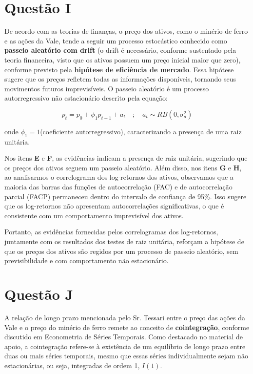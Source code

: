 \documentclass[a4paper,12pt]{article}[abntex2]
\begin{document}
\section*{\textbf{Questão I}}

De acordo com as teorias de finanças, o preço dos ativos, como o minério de ferro e as ações da Vale, tende a seguir um processo estocástico conhecido como \textbf{passeio aleatório com drift} (o drift é necessário, conforme sustentado pela teoria financeira, visto que os ativos possuem um preço inicial maior que zero), conforme previsto pela \textbf{hipótese de eficiência de mercado}. Essa hipótese sugere que os preços refletem todas as informações disponíveis, tornando seus movimentos futuros imprevisíveis. O passeio aleatório é um processo autorregressivo não estacionário descrito pela equação:

\[
p_t = p_0 + \phi_1 p_{t-1} + a_t \quad ; \quad a_t \sim RB(0, \sigma_a^2)
\]

onde \(\phi_1 = 1\)(coeficiente autorregressivo), caracterizando a presença de uma raiz unitária.

Nos itens \textbf{E} e \textbf{F}, as evidências indicam a presença de raiz unitária, sugerindo que os preços dos ativos seguem um passeio aleatório. Além disso, nos itens \textbf{G} e \textbf{H}, ao analisarmos o correlograma dos log-retornos dos ativos, observamos que a maioria das barras das funções de autocorrelação (FAC) e de autocorrelação parcial (FACP) permaneceu dentro do intervalo de confiança de 95\%. Isso sugere que os log-retornos não apresentam autocorrelações significativas, o que é consistente com um comportamento imprevisível dos ativos.

Portanto, as evidências fornecidas pelos correlogramas dos log-retornos, juntamente com os resultados dos testes de raiz unitária, reforçam a hipótese de que os preços dos ativos são regidos por um processo de passeio aleatório, sem previsibilidade e com comportamento não estacionário.



\section*{\textbf{Questão J}}

A relação de longo prazo mencionada pelo Sr. Tessari entre o preço das ações da Vale e o preço do minério de ferro remete ao conceito de \textbf{cointegração}, conforme discutido em Econometria de Séries Temporais. Como destacado no material de apoio, a cointegração refere-se à existência de um equilíbrio de longo prazo entre duas ou mais séries temporais, mesmo que essas séries individualmente sejam não estacionárias, ou seja, integradas de ordem 1, \(I(1)\).
\end{document}
